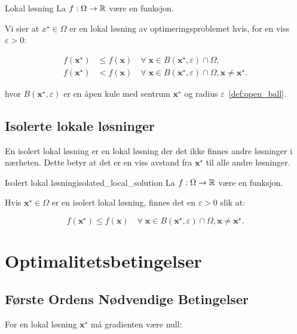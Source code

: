 \begin{definition}{Lokal løsning}{}
	La \(f: \Omega \to \mathbb{R}\) være en funksjon.

	Vi sier at \(x^\star \in \Omega\) er en lokal løsning av optimeringsproblemet hvis, for en viss \(\varepsilon > 0\):

	\begin{align*}
		f(\symbf{x}^\star) & \leq f(\symbf{x}) \quad \forall \; \symbf{x} \in B(\symbf{x}^\star, \varepsilon) \cap \Omega,                                                  \\
		f(\symbf{x}^\star) & < f(\symbf{x}) \quad \forall \; \symbf{x} \in B(\symbf{x}^\star, \varepsilon) \cap \Omega, \symbf{x} \neq \symbf{x}^\star. \tag{Strengt lokal}
	\end{align*}

	hvor \(B(\symbf{x}^\star, \varepsilon)\) er en åpen kule med sentrum \(\symbf{x}^\star\) og radius \(\varepsilon\)~\ref{def:open_ball}.
\end{definition}

\subsection{Isolerte lokale løsninger}
En isolert lokal løsning er en lokal løsning der det ikke finnes andre løsninger i nærheten. Dette betyr at det er en viss avstand fra \(\symbf{x}^\star\) til alle andre løsninger.

\begin{lemma}{Isolert lokal løsning}{isolated_local_solution}
	La \(f: \Omega \to \mathbb{R}\) være en funksjon.

	Hvis \(\symbf{x}^\star \in \Omega\) er en isolert lokal løsning, finnes det en \(\varepsilon > 0\) slik at:

	\[
		f(\symbf{x}^\star) \leq f(\symbf{x}) \quad \forall \; \symbf{x} \in B(\symbf{x}^\star, \varepsilon) \cap \Omega, \symbf{x} \neq \symbf{x}^\star.
	\]
\end{lemma}

\section{Optimalitetsbetingelser}

\subsection{Første Ordens Nødvendige Betingelser}

For en lokal løsning \(\mathbf{x}^\star\) må gradienten være null:

